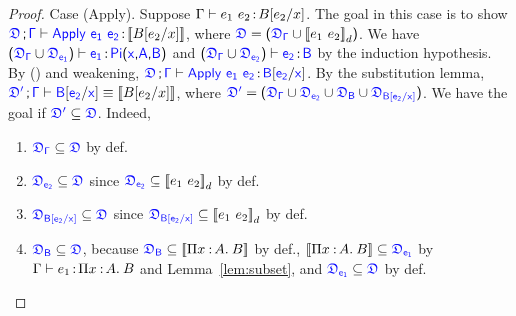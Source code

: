 \begin{theorem}
\begin{proof}
Case (Apply). \hspace{0.4cm}
Suppose $\Gamma \vdash e_1\ e_2 \hspace{0.5mm}{:}\hspace{0.5mm} B[e_2\slash x]$. The goal in this case is to show $\targetcon \vdash \targetapp{e_1}{e_2} \goodcolon \bbracket{B\sub{e_2}{x}}$, where 
$\target{\fdef} = \sfpl \target{\fdef_{\Gamma}} \cup \bbracket{e_1\ e_2}_d \sfpr$. We have
$\sfpl \target{\fdef_{\Gamma}} \cup \target{\fdef_{e_1}} \sfpr \vdash
\target{e_1} \goodcolon \targetpi{x}{A}{B}$ and
$\sfpl \target{\fdef_{\Gamma}} \cup \target{\fdef_{e_2}} \sfpr \vdash
\target{e_2} \goodcolon \target{B}$ by the induction hypothesis.
By () and weakening,
$\targetcon \vdash \targetapp{e_1}{e_2} \goodcolon \target{B}\targetsub{e_2}{x}$. By the substitution lemma, 
$\target{\fdef'} \semicolon \target{\Gamma} \vdash \target{B}\targetsub{e_2}{x} \equiv \bbracket{B\sub{e_2}{x}}$, where
$\target{\fdef'} = \sfpl \target{\fdef_{\Gamma}} \cup \target{\fdef_{e_2}} \cup \target{\fdef_{B}} \cup \target{\fdef_{B\sub{e_2}{x}}} \sfpr$. We have the goal if $\target{\fdef'} \subseteq \target{\fdef}$. Indeed,
\begin{enumerate}
\item $\target{\fdef_{\Gamma}} \subseteq \target{\fdef}$ by def.
\item $\target{\fdef_{e_2}} \subseteq \target{\fdef}$ since $\target{\fdef_{e_2}} \subseteq \bbracket{e_1\ e_2}_d$ by def.
\item $\target{\fdef_{B\sub{e_2}{x}}} \subseteq \target{\fdef}$ since $\target{\fdef_{B\sub{e_2}{x}}} \subseteq \bbracket{e_1\ e_2}_d$ by def.
\item $\target{\fdef_{B}} \subseteq \target{\fdef}$, because $\target{\fdef_{B}} \subseteq \bbracket{\pitype{x}{A}{B}}$ by def., $\bbracket{\pitype{x}{A}{B}} \subseteq \target{\fdef_{e_1}}$ by $\Gamma \vdash e_1 \hspace{0.5mm}{:}\hspace{0.5mm} \Pi x\mkern1.5mu{\hspace{0.5mm}{:}\hspace{0.5mm}} A.\hspace{0.8mm}B$ and Lemma~\ref{lem:subset}, and $\target{\fdef_{e_1}} \subseteq \target{\fdef}$ by def.
\end{enumerate}


\end{proof}
\end{theorem}
